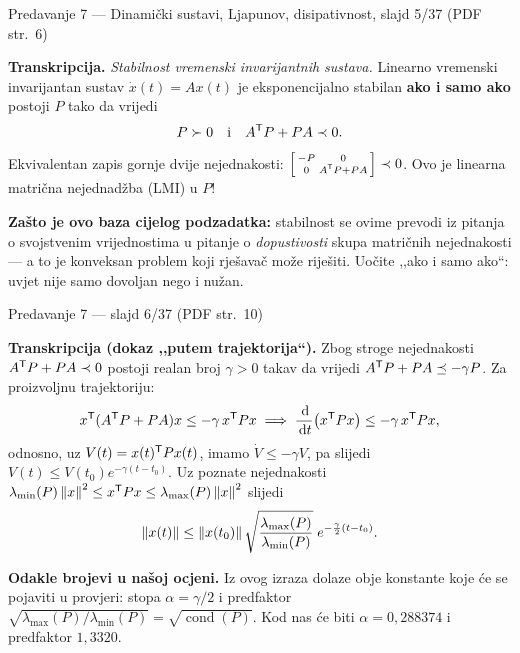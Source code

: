 \begin{izvor}{Predavanje 7 --- Dinamički sustavi, Ljapunov, disipativnost, slajd 5/37 (PDF str.~6)}

\textbf{Transkripcija.} \emph{Stabilnost vremenski invarijantnih sustava.}
Linearno vremenski invarijantan sustav $\dot{x}(t) = Ax(t)$ je eksponencijalno
stabilan \textbf{ako i samo ako} postoji $P$ tako da vrijedi
\[
P \succ 0 \quad \text{i} \quad A^{\mathsf{T}} P + PA \prec 0 .
\]
Ekvivalentan zapis gornje dvije nejednakosti:
$\begin{bsmallmatrix} -P & 0 \\ 0 & A^{\mathsf{T}} P + PA \end{bsmallmatrix} \prec 0$.
Ovo je linearna matrična nejednadžba (LMI) u $P$!

\textbf{Zašto je ovo baza cijelog podzadatka:} stabilnost se ovime prevodi iz
pitanja o svojstvenim vrijednostima u pitanje o \emph{dopustivosti} skupa
matričnih nejednakosti --- a to je konveksan problem koji rješavač može riješiti.
Uočite ,,ako i samo ako``: uvjet nije samo dovoljan nego i nužan.
\end{izvor}

\begin{izvor}{Predavanje 7 --- slajd 6/37 (PDF str.~10)}

\textbf{Transkripcija (dokaz ,,putem trajektorija``).} Zbog stroge nejednakosti
$A^{\mathsf{T}} P + PA \prec 0$ postoji realan broj $\gamma > 0$ takav da vrijedi
$A^{\mathsf{T}} P + PA \preceq -\gamma P$. Za proizvoljnu trajektoriju:
\[
x^{\mathsf{T}}(A^{\mathsf{T}} P + PA)x \leq -\gamma\, x^{\mathsf{T}} P x
\;\Longrightarrow\;
\frac{\,\mathrm{d}}{\,\mathrm{d} t}\bigl(x^{\mathsf{T}} P x\bigr) \leq -\gamma\, x^{\mathsf{T}} P x ,
\]
odnosno, uz $V(t) = x(t)^{\mathsf{T}} P x(t)$, imamo $\dot{V} \leq -\gamma V$, pa slijedi
$V(t) \leq V(t_0)e^{-\gamma(t-t_0)}$. Uz poznate nejednakosti
$\lambda_{\min}(P)\left\lVert x \right\rVert^2 \leq x^{\mathsf{T}} P x \leq \lambda_{\max}(P)\left\lVert x \right\rVert^2$
slijedi
\[
\left\lVert x(t) \right\rVert \leq \left\lVert x(t_0) \right\rVert\sqrt{\frac{\lambda_{\max}(P)}{\lambda_{\min}(P)}}\;e^{-\frac{\gamma}{2}(t-t_0)} .
\]

\textbf{Odakle brojevi u našoj ocjeni.} Iz ovog izraza dolaze obje konstante koje
će se pojaviti u provjeri: stopa $\alpha = \gamma/2$ i predfaktor
$\sqrt{\lambda_{\max}(P)/\lambda_{\min}(P)} = \sqrt{\operatorname{cond}(P)}$.
Kod nas će biti $\alpha = 0{,}288374$ i predfaktor $1{,}3320$.
\end{izvor}

